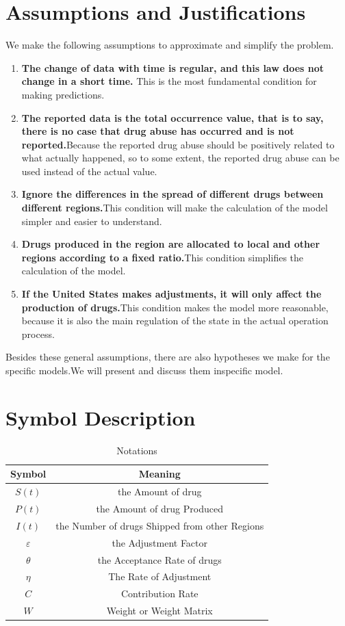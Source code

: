 \documentclass[12pt]{mcmthesis}
\begin{document}
\section{Assumptions and Justifications}
We make the following assumptions to approximate and simplify the problem.
\begin{enumerate}
  \item \textbf{The change of data with time is regular, and this law does not change in a short time. }This is the most fundamental condition for making predictions.
  \item \textbf{The reported data is the total occurrence value, that is to say, there is no case that drug abuse has occurred and is not reported.}Because the reported drug abuse should be positively related to what actually happened, so to some extent, the reported drug abuse can be used instead of the actual value.
  \item \textbf{Ignore the differences in the spread of different drugs between different regions.}This condition will make the calculation of the model simpler and easier to understand.
\item \textbf{Drugs produced in the region are allocated to local and other regions according to a fixed ratio.}This condition simplifies the calculation of the model.
\item \textbf{If the United States makes adjustments, it will only affect the production of drugs.}This condition makes the model more reasonable, because it is also the main regulation of the state in the actual operation process.
\end{enumerate}

Besides these general assumptions, there are also hypotheses we make for the specific models.We will present and discuss them inspecific model.

\section{Symbol Description}
\begin{table}[htbp]
 \centering
    \caption{Notations}\label{Notations}
  \begin{tabular}{c|c}
     \hline
     Symbol & Meaning \\\hline
     $S(t)$ & the Amount of drug \\
     $P(t)$ &the Amount of
drug Produced\\
$I(t)$& the Number of drugs Shipped from other Regions\\
$\varepsilon$&the Adjustment Factor \\
$\theta$&the
Acceptance Rate of drugs\\
$\eta$&The Rate of Adjustment\\
$C$&Contribution Rate\\
     $W$ & Weight or Weight Matrix \\
     \hline
   \end{tabular}
\end{table}
\end{document}
